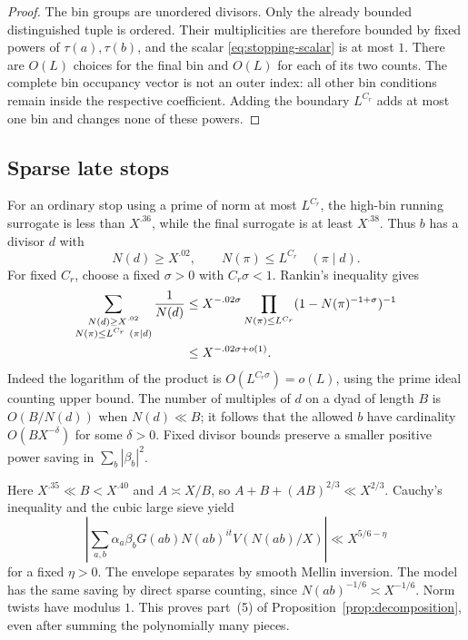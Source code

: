 \begin{proof}
The bin groups are unordered divisors.  Only the already bounded
distinguished tuple is ordered.  Their multiplicities are therefore
bounded by fixed powers of $\tau(a),\tau(b)$, and the scalar
\eqref{eq:stopping-scalar} is at most $1$.  There are $O(L)$ choices
for the final bin and $O(L)$ for each of its two counts.  The complete
bin occupancy vector is not an outer index: all other bin conditions
remain inside the respective coefficient.  Adding the boundary
$L^{C_r}$ adds at most one bin and changes none of these powers.
\end{proof}

\subsection{Sparse late stops}

For an ordinary stop using a prime of norm at most $L^{C_r}$,
the high-bin running surrogate is less than $X^{.36}$, while the
final surrogate is at least $X^{.38}$.  Thus $b$ has a divisor $d$
with
\[
 N(d)\ge X^{.02},\qquad
 N(\pi)\le L^{C_r}\quad(\pi\mid d).
\]
For fixed $C_r$, choose a fixed $\sigma>0$ with $C_r\sigma<1$.
Rankin's inequality gives
\begin{align}
 \sum_{\substack{N(d)\ge X^{.02}\\
                  N(\pi)\le L^{C_r}\ (\pi\mid d)}}\frac1{N(d)}
 &\le X^{-.02\sigma}
 \prod_{N(\pi)\le L^{C_r}}
       (1-N(\pi)^{-1+\sigma})^{-1}
 \label{eq:late-stop-rankin}\\
 &\le X^{-.02\sigma+o(1)}.\notag
\end{align}
Indeed the logarithm of the product is $O(L^{C_r\sigma})=o(L)$,
using the prime ideal counting upper bound.  The number of multiples
of $d$ on a dyad of length $B$ is $O(B/N(d))$ when $N(d)\ll B$;
it follows that the allowed $b$ have cardinality $O(BX^{-\delta})$
for some $\delta>0$.  Fixed divisor bounds preserve a smaller positive
power saving in $\sum_b|\beta_b|^2$.

Here $X^{.35}\ll B<X^{.40}$ and $A\asymp X/B$, so
$A+B+(AB)^{2/3}\ll X^{2/3}$.  Cauchy's inequality and the cubic
large sieve yield
\[
 \left|\sum_{a,b}\alpha_a\beta_bG(ab)N(ab)^{it}
                 V(N(ab)/X)\right|
 \ll X^{5/6-\eta}
\]
for a fixed $\eta>0$.  The envelope separates by smooth Mellin
inversion.  The model has the same saving by direct sparse counting,
since $N(ab)^{-1/6}\asymp X^{-1/6}$.  Norm twists have modulus $1$.
This proves part~(5) of Proposition~\ref{prop:decomposition}, even
after summing the polynomially many pieces.

